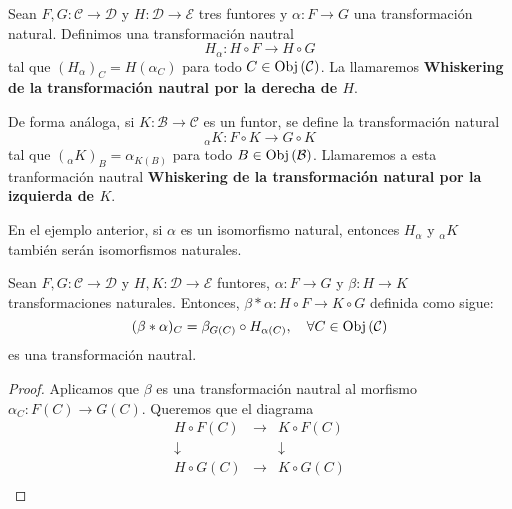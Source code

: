 \documentclass[12pt]{report}
\theoremstyle{largebreak}
\newcommand\cf[3]{\ensuremath{#1:#2\rightarrow#3}}
\newcommand{\Obj}[1]{\ensuremath{\textup{Obj}\left(#1\right)}}
\begin{document}
    \begin{exa}
        Sean $\cf{F,G}{\mathcal{C}}{\mathcal{D}}$ y $\cf{H}{\mathcal{D}}{\mathcal{E}}$ tres funtores y $\cf{\alpha}{F}{G}$ una transformación natural. Definimos una transformación nautral
        \begin{equation*}
            \cf{H_\alpha}{H\circ F}{H\circ G}
        \end{equation*}
        tal que $(H_\alpha)_C=H(\alpha_C)$ para todo $C\in\Obj{\mathcal{C}}$. La llamaremos \textbf{Whiskering de la transformación nautral por la derecha de $H$}.

        De forma análoga, si $\cf{K}{\mathcal{B}}{\mathcal{C}}$ es un funtor, se define la transformación natural
        \begin{equation*}
            _\alpha K:F\circ K\rightarrow G\circ K
        \end{equation*}
        tal que $(_\alpha K)_B=\alpha_{ K(B)}$ para todo $B\in\Obj{\mathcal{B}}$. Llamaremos a esta tranformación nautral \textbf{Whiskering de la transformación natural por la izquierda de $K$}.
    \end{exa}

    \begin{obs}
        En el ejemplo anterior, si $\alpha$ es un isomorfismo natural, entonces $H_\alpha$ y $_\alpha K$ también serán isomorfismos naturales.
    \end{obs}

    \begin{propo}
        Sean $\cf{F,G}{\mathcal{C}}{\mathcal{D}}$ y $\cf{H,K}{\mathcal{D}}{\mathcal{E}}$ funtores, $\cf{\alpha}{F}{G}$ y $\cf{\beta}{H}{K}$ transformaciones naturales. Entonces, $\cf{\beta*\alpha}{H\circ F}{K\circ G}$ definida como sigue:
        \begin{equation*}
            (\beta*\alpha)_C=\beta_{G(C)} \circ H_{\alpha(C)},\quad \forall C\in\Obj{\mathcal{C}}
        \end{equation*}
        es una transformación nautral.
    \end{propo}

    \begin{proof}
        Aplicamos que $\beta$ es una transformación nautral al morfismo $\cf{\alpha_C}{F(C)}{G(C)}$. Queremos que el diagrama
        \begin{equation*}
            \begin{array}{ccc}
                H\circ F(C) & \longrightarrow & K\circ F(C)\\
                \downarrow & & \downarrow\\
                H\circ G(C) &\longrightarrow &K\circ G(C)\\
            \end{array}
        \end{equation*}
    \end{proof}
\end{document}
